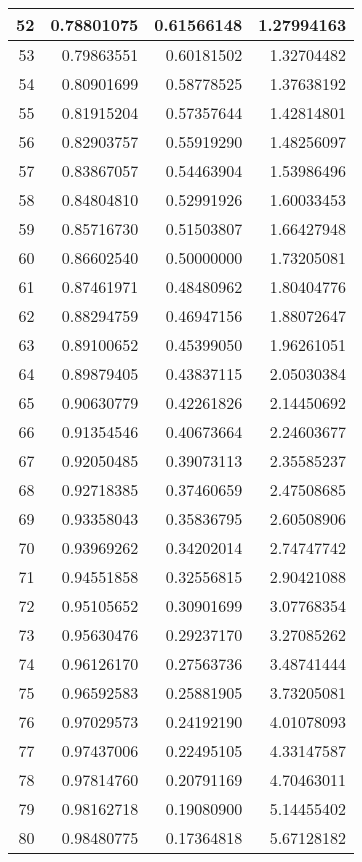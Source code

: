 \documentclass{jsarticle}
\begin{document}
\begin{longtable}{|r|r|r|r|}
	52	&0.78801075	&0.61566148	&1.27994163	\\ \hline
	53	&0.79863551	&0.60181502	&1.32704482	\\ \hline
	54	&0.80901699	&0.58778525	&1.37638192	\\ \hline
	55	&0.81915204	&0.57357644	&1.42814801	\\ \hline
	56	&0.82903757	&0.55919290	&1.48256097	\\ \hline
	57	&0.83867057	&0.54463904	&1.53986496	\\ \hline
	58	&0.84804810	&0.52991926	&1.60033453	\\ \hline
	59	&0.85716730	&0.51503807	&1.66427948	\\ \hline
	60	&0.86602540	&0.50000000	&1.73205081	\\ \hline
	61	&0.87461971	&0.48480962	&1.80404776	\\ \hline
	62	&0.88294759	&0.46947156	&1.88072647	\\ \hline
	63	&0.89100652	&0.45399050	&1.96261051	\\ \hline
	64	&0.89879405	&0.43837115	&2.05030384	\\ \hline
	65	&0.90630779	&0.42261826	&2.14450692	\\ \hline
	66	&0.91354546	&0.40673664	&2.24603677	\\ \hline
	67	&0.92050485	&0.39073113	&2.35585237	\\ \hline
	68	&0.92718385	&0.37460659	&2.47508685	\\ \hline
	69	&0.93358043	&0.35836795	&2.60508906	\\ \hline
	70	&0.93969262	&0.34202014	&2.74747742	\\ \hline
	71	&0.94551858	&0.32556815	&2.90421088	\\ \hline
	72	&0.95105652	&0.30901699	&3.07768354	\\ \hline
	73	&0.95630476	&0.29237170	&3.27085262	\\ \hline
	74	&0.96126170	&0.27563736	&3.48741444	\\ \hline
	75	&0.96592583	&0.25881905	&3.73205081	\\ \hline
	76	&0.97029573	&0.24192190	&4.01078093	\\ \hline
	77	&0.97437006	&0.22495105	&4.33147587	\\ \hline
	78	&0.97814760	&0.20791169	&4.70463011	\\ \hline
	79	&0.98162718	&0.19080900	&5.14455402	\\ \hline
	80	&0.98480775	&0.17364818	&5.67128182	\\ \hline

\end{longtable}
\end{document}
